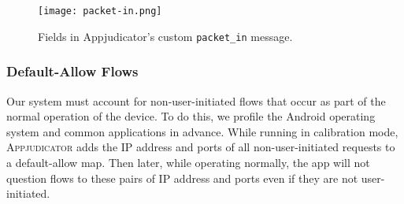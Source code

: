 \begin{figure}[p]
	\centering
	\texttt{[image: packet-in.png]}
    \caption{Fields in Appjudicator's custom \texttt{packet\_in} message.}
    \label{fig:packet-in}
\end{figure}

\subsubsection{Default-Allow Flows}
\label{sec:default-allow-flows}

Our system must account for non-user-initiated flows that occur as part of the
normal operation of the device. To do this, we profile the Android operating
system and common applications in advance.  While running in calibration mode,
\textsc{Appjudicator} adds the IP address and ports of all non-user-initiated
requests to a default-allow map. Then later, while operating normally, the app
will not question flows to these pairs of IP address and ports even if they are
not user-initiated.


\newpage
